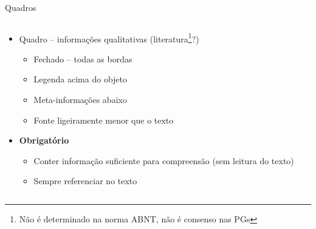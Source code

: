 \documentclass{beamer}
\begin{document}

\begin{frame}{Quadros}
  \begin{columns}%
    \begin{column}{.5\textwidth}
      \begin{itemize}
        \scriptsize
      \item Quadro -- informações qualitativas ({\tiny literatura\footnote[frame]{\scriptsize Não é determinado na norma ABNT, não é consenso nas PGs}?})
        \begin{itemize}
          \tiny
        \item Fechado -- todas as bordas
        \item Legenda acima do objeto
        \item Meta-informações abaixo
        \item Fonte ligeiramente menor que o texto
        \end{itemize}
        \bigskip
      \item \alert{\bf Obrigatório}
        \begin{itemize}
          \tiny
        \item Conter informação suficiente para compreensão ({\tiny sem leitura do texto})
        \item Sempre referenciar no texto
        \end{itemize}
      \end{itemize}
    \end{column}
    \begin{column}{.5\textwidth}
    \end{column}
  \end{columns}


\end{frame}
\end{document}
